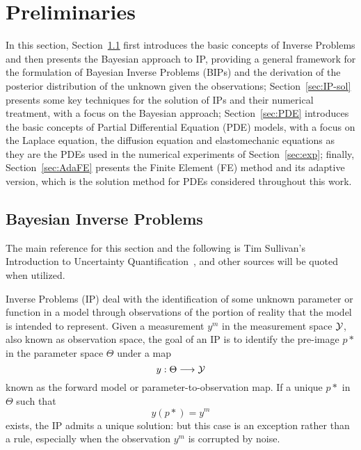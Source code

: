 \section{Preliminaries} \label{sec:preliminaries}

In this section, Section~\ref{sec:BIP} first introduces the basic concepts of Inverse Problems and then presents the Bayesian approach to IP, providing a general framework for the formulation of Bayesian Inverse Problems (BIPs) and the derivation of the posterior distribution of the unknown given the observations; Section~\ref{sec:IP-sol} presents some key techniques for the solution of IPs and their numerical treatment, with a focus on the Bayesian approach; Section~\ref{sec:PDE} introduces the basic concepts of Partial Differential Equation (PDE) models, with a focus on the Laplace equation, the diffusion equation and elastomechanic equations as they are the PDEs used in the numerical experiments of Section~\ref{sec:exp}; finally, Section~\ref{sec:AdaFE} presents the Finite Element (FE) method and its adaptive version, which is the solution method for PDEs considered throughout this work.

\subsection{Bayesian Inverse Problems}\label{sec:BIP}

The main reference for this section and the following is Tim Sullivan's Introduction to Uncertainty Quantification~\cite{Sullivan2015}, and other sources will be quoted when utilized. \medskip

Inverse Problems (IP) deal with the identification of some unknown parameter or function in a model through observations of the portion of reality that the model is intended to represent.\newline
Given a measurement $y^m$ in the measurement space $\mathcal Y$, also known as observation space, the goal of an IP is to identify the pre-image $p*$ in the parameter space $\Theta$ under a map \[y : \Theta \longrightarrow \mathcal Y \] known as the forward model or parameter-to-observation map.
If a unique $p*$ in $\Theta$ such that
\begin{equation}\label{eq:IP0}
    y(p*) = y^m
\end{equation}
exists, the IP admits a unique solution: but this case is an exception rather than a rule, especially when the observation $y^m$ is corrupted by noise.

